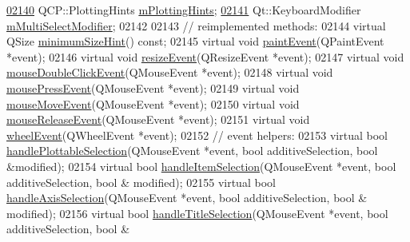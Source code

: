 \begin{DoxyCode}
\hypertarget{a00116_source_l02140}{}\hyperlink{a00116_af6de5d56e261af21cf6223179fc58883}{02140}   QCP::PlottingHints \hyperlink{a00116_af6de5d56e261af21cf6223179fc58883}{mPlottingHints};
\hypertarget{a00116_source_l02141}{}\hyperlink{a00116_a690dbabf892af5969b09e9f69bb83a9b}{02141}   Qt::KeyboardModifier \hyperlink{a00116_a690dbabf892af5969b09e9f69bb83a9b}{mMultiSelectModifier};
02142   
02143   \textcolor{comment}{// reimplemented methods:}
02144   \textcolor{keyword}{virtual} QSize \hyperlink{a00116_a4904f06d831afae29cd5d10e889388c3}{minimumSizeHint}() \textcolor{keyword}{const};
02145   \textcolor{keyword}{virtual} \textcolor{keywordtype}{void} \hyperlink{a00116_a2bbc3b1c24bfcc8a7cc1f3008cdd9b73}{paintEvent}(QPaintEvent *event);
02146   \textcolor{keyword}{virtual} \textcolor{keywordtype}{void} \hyperlink{a00116_a13e05523a40c3f08875df5cde85cf0d9}{resizeEvent}(QResizeEvent *event);
02147   \textcolor{keyword}{virtual} \textcolor{keywordtype}{void} \hyperlink{a00116_a467e30feeea8ec0dd35f19ca32a55ba7}{mouseDoubleClickEvent}(QMouseEvent *event);
02148   \textcolor{keyword}{virtual} \textcolor{keywordtype}{void} \hyperlink{a00116_a460b092e82c0eb94ef6c32a10acc822a}{mousePressEvent}(QMouseEvent *event);
02149   \textcolor{keyword}{virtual} \textcolor{keywordtype}{void} \hyperlink{a00116_ac64727a4f442770f6e5e6be2d0530843}{mouseMoveEvent}(QMouseEvent *event);
02150   \textcolor{keyword}{virtual} \textcolor{keywordtype}{void} \hyperlink{a00116_a724e97d2e8c03e68adac5f4b6164a1b3}{mouseReleaseEvent}(QMouseEvent *event);
02151   \textcolor{keyword}{virtual} \textcolor{keywordtype}{void} \hyperlink{a00116_a7b8bd7e8d3a1d23a8595e9c6a6b76ef1}{wheelEvent}(QWheelEvent *event);
02152   \textcolor{comment}{// event helpers:}
02153   \textcolor{keyword}{virtual} \textcolor{keywordtype}{bool} \hyperlink{a00116_a881c8652ebb912345de27687817845cf}{handlePlottableSelection}(QMouseEvent *event, \textcolor{keywordtype}{bool} additiveSelection,
       \textcolor{keywordtype}{bool} &modified);  
02154   \textcolor{keyword}{virtual} \textcolor{keywordtype}{bool} \hyperlink{a00116_aa1ad9839539b4cdf9f7da768336650f2}{handleItemSelection}(QMouseEvent *event, \textcolor{keywordtype}{bool} additiveSelection, \textcolor{keywordtype}{bool} &
      modified);  
02155   \textcolor{keyword}{virtual} \textcolor{keywordtype}{bool} \hyperlink{a00116_a6085478fe8ba07b2a192cf8217133cb3}{handleAxisSelection}(QMouseEvent *event, \textcolor{keywordtype}{bool} additiveSelection, \textcolor{keywordtype}{bool} &
      modified);
02156   \textcolor{keyword}{virtual} \textcolor{keywordtype}{bool} \hyperlink{a00116_ae688ab743e775cd0c69941a082dd32e3}{handleTitleSelection}(QMouseEvent *event, \textcolor{keywordtype}{bool} additiveSelection, \textcolor{keywordtype}{bool} &

\end{DoxyCode}
